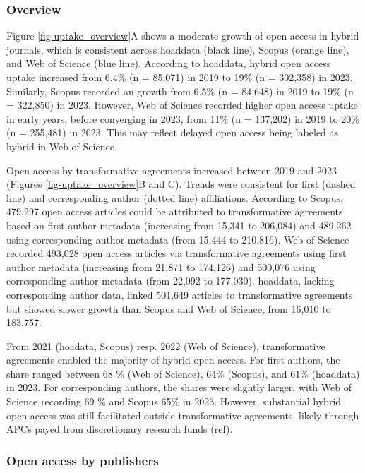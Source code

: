 \documentclass[a4paper,man,floatsintext,longtable,noextraspace,10pt]{apa6}
\begin{document}
\subsubsection{Overview}\label{overview-1}

Figure \ref{fig-uptake_overview}A shows a moderate growth of open access
in hybrid journals, which is consistent across hoaddata (black line),
Scopus (orange line), and Web of Science (blue line). According to
hoaddata, hybrid open access uptake increased from 6.4\% (n = 85,071) in
2019 to 19\% (n = 302,358) in 2023. Similarly, Scopus recorded an growth
from 6.5\% (n = 84,648) in 2019 to 19\% (n = 322,850) in 2023. However,
Web of Science recorded higher open access uptake in early years, before
converging in 2023, from 11\% (n = 137,202) in 2019 to 20\% (n =
255,481) in 2023. This may reflect delayed open access being labeled as
hybrid in Web of Science.

Open access by transformative agreements increased between 2019 and 2023
(Figures \ref{fig-uptake_overview}B and C). Trends were consistent for
first (dashed line) and corresponding author (dotted line) affiliations.
According to Scopus, 479,297 open access articles could be attributed to
transformative agreements based on first author metadata (increasing
from 15,341 to 206,084) and 489,262 using corresponding author metadata
(from 15,444 to 210,816). Web of Science recorded 493,028 open access
articles via transformative agreements using first author metadata
(increasing from 21,871 to 174,126) and 500,076 using corresponding
author metadata (from 22,092 to 177,030). hoaddata, lacking
corresponding author data, linked 501,649 articles to transformative
agreements but showed slower growth than Scopus and Web of Science, from
16,010 to 183,757.

From 2021 (hoadata, Scopus) resp. 2022 (Web of Science), transformative
agreements enabled the majority of hybrid open access. For first
authors, the share ranged between 68 \% (Web of Science), 64\% (Scopus),
and 61\% (hoaddata) in 2023. For corresponding authors, the shares were
slightly larger, with Web of Science recording 69 \% and Scopus 65\% in
2023. However, substantial hybrid open access was still facilitated
outside transformative agreements, likely through APCs payed from
discretionary research funds (ref).

\subsubsection{Open access by
publishers}\label{open-access-by-publishers}
\end{document}
